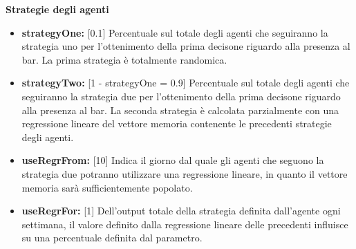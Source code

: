 \documentclass{article}
\begin{document}
{    \textbf{Strategie degli agenti}
    \begin{itemize}
        \item \textbf{strategyOne:} [0.1] Percentuale sul totale degli agenti che seguiranno la strategia uno per l'ottenimento della prima decisone riguardo alla presenza al bar. La prima strategia è totalmente randomica.
        \item \textbf{strategyTwo: } [1 - strategyOne = 0.9] Percentuale sul totale degli agenti che seguiranno la strategia due per l'ottenimento della prima decisone riguardo alla presenza al bar. La seconda strategia è calcolata parzialmente con una regressione lineare del vettore memoria contenente le precedenti strategie degli agenti.
        \item \textbf{useRegrFrom: } [10] Indica il giorno dal quale gli agenti che seguono la strategia due potranno utilizzare una regressione lineare, in quanto il vettore memoria sarà sufficientemente popolato.
        \item \textbf{useRegrFor: } [1] Dell'output totale della strategia definita dall'agente ogni settimana, il valore definito dalla regressione lineare delle precedenti influisce su una percentuale definita dal parametro.\newline
    \end{itemize}

   

    
    
}
\end{document}
